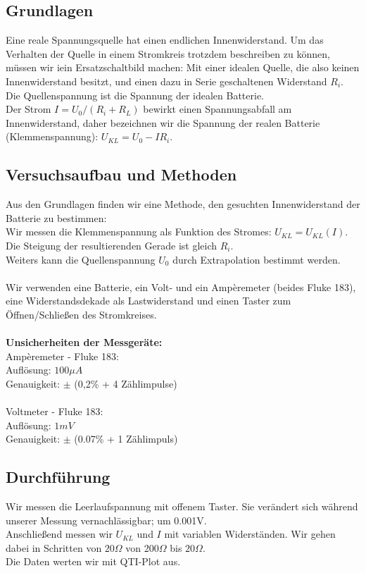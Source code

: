 \documentclass{article}
\begin{document}
\subsection{Grundlagen}
Eine reale Spannungsquelle hat einen endlichen Innenwiderstand. Um das Verhalten der Quelle in einem Stromkreis trotzdem beschreiben zu können, müssen wir iein Ersatzschaltbild machen: Mit einer idealen Quelle, die also keinen Innenwiderstand besitzt, und einen dazu in Serie geschaltenen Widerstand $R_i$.\\
Die Quellenspannung ist die Spannung der idealen Batterie.\\
Der Strom $I=U_0/(R_i+R_L)$ bewirkt einen Spannungsabfall am Innenwiderstand, daher bezeichnen wir die Spannung der realen Batterie (Klemmenspannung): $U_{KL}=U_0-IR_i$.


\subsection{Versuchsaufbau und Methoden}
Aus den Grundlagen finden wir eine Methode, den gesuchten Innenwiderstand der Batterie zu bestimmen:\\
Wir messen die Klemmenspannung als Funktion des Stromes: $U_{KL}=U_{KL}(I)$. Die Steigung der resultierenden Gerade ist gleich $R_i$.\\
Weiters kann die Quellenspannung $U_0$ durch Extrapolation bestimmt werden.\\
\\
Wir verwenden eine Batterie, ein Volt- und ein Ampèremeter (beides Fluke 183), eine Widerstandsdekade als Lastwiderstand und einen Taster zum Öffnen/Schließen des Stromkreises.\\
\\
\textbf{Unsicherheiten der Messgeräte:} \\
Ampèremeter - Fluke 183:\\
Auflösung: $100\mu A$\\
Genauigkeit: $\pm$ (0,2\% + 4 Zählimpulse)\\
\\
Voltmeter - Fluke 183:\\
Auflösung: $1mV$\\
Genauigkeit: $\pm$ (0.07\% + 1 Zählimpuls)


\subsection{Durchführung}
Wir messen die Leerlaufspannung mit offenem Taster. Sie verändert sich während unserer Messung vernachlässigbar; um 0.001V.\\ 
Anschließend messen wir $U_{KL}$ und $I$ mit variablen Widerständen. Wir gehen dabei in Schritten von $20\Omega$ von 200$\Omega$ bis $20\Omega$.\\
Die Daten werten wir mit QTI-Plot aus.
\end{document}
